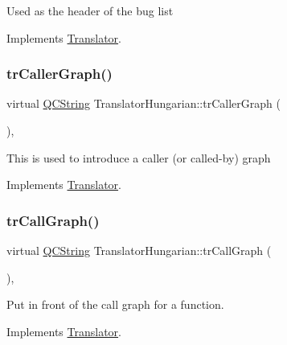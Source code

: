 Used as the header of the bug list 

Implements \mbox{\hyperlink{class_translator}{Translator}}.

\mbox{\label{class_translator_hungarian_a35dc43e954432d28c07200593967528d}} 
\subsubsection{\texorpdfstring{trCallerGraph()}{trCallerGraph()}}
{\footnotesize\ttfamily virtual \mbox{\hyperlink{class_q_c_string}{Q\+C\+String}} Translator\+Hungarian\+::tr\+Caller\+Graph (\begin{DoxyParamCaption}{ }\end{DoxyParamCaption})\hspace{0.3cm}{\ttfamily [inline]}, {\ttfamily [virtual]}}

This is used to introduce a caller (or called-\/by) graph 

Implements \mbox{\hyperlink{class_translator}{Translator}}.

\mbox{\label{class_translator_hungarian_a688d685f3a32c3e006c04f334ba74f68}} 
\subsubsection{\texorpdfstring{trCallGraph()}{trCallGraph()}}
{\footnotesize\ttfamily virtual \mbox{\hyperlink{class_q_c_string}{Q\+C\+String}} Translator\+Hungarian\+::tr\+Call\+Graph (\begin{DoxyParamCaption}{ }\end{DoxyParamCaption})\hspace{0.3cm}{\ttfamily [inline]}, {\ttfamily [virtual]}}

Put in front of the call graph for a function. 

Implements \mbox{\hyperlink{class_translator}{Translator}}.

\mbox{\label{class_translator_hungarian_aae23d29beacdbecbd5149e793086153d}} 
